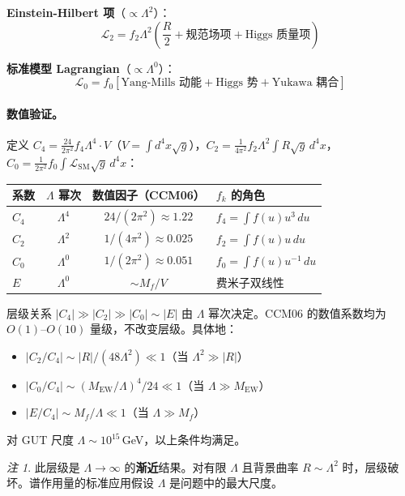 \documentclass[11pt,a4paper]{ctexart}
\theoremstyle{remark}
\newtheorem{remark}[theorem]{注}
\begin{document}
\textbf{Einstein-Hilbert 项}（$\propto \Lambda^2$）：
\[
  \mathcal{L}_2 = f_2 \Lambda^2 \left(\frac{R}{2} + \text{规范场项} + \text{Higgs 质量项}\right)
\]

\textbf{标准模型 Lagrangian}（$\propto \Lambda^0$）：
\[
  \mathcal{L}_0 = f_0 \left[\text{Yang-Mills 动能} + \text{Higgs 势} + \text{Yukawa 耦合}\right]
\]

\paragraph{数值验证。}
定义 $C_4 = \frac{24}{2\pi^2} f_4 \Lambda^4 \cdot V$（$V = \int d^4x\sqrt{g}$），$C_2 = \frac{1}{4\pi^2} f_2 \Lambda^2 \int R\sqrt{g}\,d^4x$，$C_0 = \frac{1}{2\pi^2} f_0 \int \mathcal{L}_{\mathrm{SM}}\sqrt{g}\,d^4x$：

\begin{table}[h]
\centering
\begin{tabular}{lccl}
\toprule
系数 & $\Lambda$ 幂次 & 数值因子（CCM06） & $f_k$ 的角色 \\
\midrule
$C_4$ & $\Lambda^4$ & $24/(2\pi^2) \approx 1.22$ & $f_4 = \int f(u) u^3\,du$ \\
$C_2$ & $\Lambda^2$ & $1/(4\pi^2) \approx 0.025$ & $f_2 = \int f(u) u\,du$ \\
$C_0$ & $\Lambda^0$ & $1/(2\pi^2) \approx 0.051$ & $f_0 = \int f(u) u^{-1}\,du$ \\
$E$ & $\Lambda^0$ & $\sim M_f / V$ & 费米子双线性 \\
\bottomrule
\end{tabular}
\end{table}

层级关系 $|C_4| \gg |C_2| \gg |C_0| \sim |E|$ 由 $\Lambda$ 幂次决定。CCM06 的数值系数均为 $O(1)$--$O(10)$ 量级，不改变层级。具体地：
\begin{itemize}
  \item $|C_2/C_4| \sim |R|/(48\Lambda^2) \ll 1$（当 $\Lambda^2 \gg |R|$）
  \item $|C_0/C_4| \sim (M_{\mathrm{EW}}/\Lambda)^4 / 24 \ll 1$（当 $\Lambda \gg M_{\mathrm{EW}}$）
  \item $|E/C_4| \sim M_f / \Lambda \ll 1$（当 $\Lambda \gg M_f$）
\end{itemize}
对 GUT 尺度 $\Lambda \sim 10^{15}$\,GeV，以上条件均满足。

\begin{remark}
此层级是 $\Lambda \to \infty$ 的\textbf{渐近}结果。对有限 $\Lambda$ 且背景曲率 $R \sim \Lambda^2$ 时，层级破坏。谱作用量的标准应用假设 $\Lambda$ 是问题中的最大尺度。
\end{remark}
\end{document}
